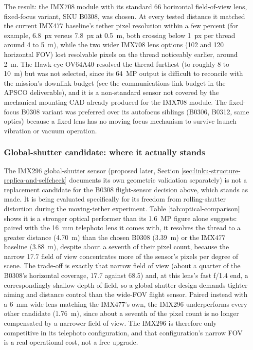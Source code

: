 The result: the IMX708 module with its standard 66\textdegree{} horizontal field-of-view lens, fixed-focus variant, SKU B0308, was chosen. At every tested distance it matched the current IMX477 baseline's tether pixel resolution within a few percent (for example, 6.8~px versus 7.8~px at 0.5~m, both crossing below 1~px per thread around 4 to 5~m), while the two wider IMX708 lens options (102\textdegree{} and 120\textdegree{} horizontal FOV) lost resolvable pixels on the thread noticeably earlier, around 2~m. The Hawk-eye OV64A40 resolved the thread furthest (to roughly 8 to 10~m) but was not selected, since its 64~MP output is difficult to reconcile with the mission's downlink budget (see the communications link budget in the APSCO deliverable), and it is a non-standard sensor not covered by the mechanical mounting CAD already produced for the IMX708 module. The fixed-focus B0308 variant was preferred over its autofocus siblings (B0306, B0312, same optics) because a fixed lens has no moving focus mechanism to survive launch vibration or vacuum operation.

\subsubsection{Global-shutter candidate: where it actually stands}
\label{sec:global-shutter-candidate}

The IMX296 global-shutter sensor (proposed later, Section \ref{sec:linku-structure-replica-and-selfcheck} documents its own geometric validation separately) is not a replacement candidate for the B0308 flight-sensor decision above, which stands as made. It is being evaluated specifically for its freedom from rolling-shutter distortion during the moving-tether experiment. Table \ref{tab:optical-comparison} shows it is a stronger optical performer than its 1.6~MP figure alone suggests: paired with the 16~mm telephoto lens it comes with, it resolves the thread to a greater distance (4.70~m) than the chosen B0308 (3.39~m) or the IMX477 baseline (3.88~m), despite about a seventh of their pixel count, because the narrow 17.7\textdegree{} field of view concentrates more of the sensor's pixels per degree of scene. The trade-off is exactly that narrow field of view (about a quarter of the B0308's horizontal coverage, 17.7\textdegree{} against 68.5\textdegree{}) and, at this lens's fast f/1.4 end, a correspondingly shallow depth of field, so a global-shutter design demands tighter aiming and distance control than the wide-FOV flight sensor. Paired instead with a 6~mm wide lens matching the IMX477's own, the IMX296 underperforms every other candidate (1.76~m), since about a seventh of the pixel count is no longer compensated by a narrower field of view. The IMX296 is therefore only competitive in its telephoto configuration, and that configuration's narrow FOV is a real operational cost, not a free upgrade.

